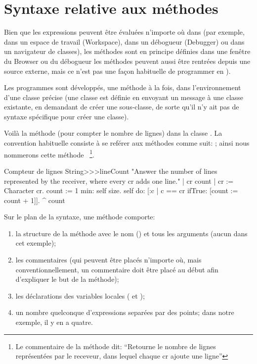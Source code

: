 \documentclass[a4paper,10pt,twoside]{book}
\begin{document}
\section{Syntaxe relative aux méthodes}
Bien que les expressions peuvent être évaluées n'importe
où dans \pharo (par exemple, dans un espace de travail (Workspace),
dans un débogueur (Debugger) ou dans un navigateur de classes), 
les méthodes sont en principe définies dans une fenêtre du
Browser ou du débogueur
les méthodes peuvent aussi être rentrées %
depuis une source externe, mais ce n'est pas une façon habituelle de programmer en \pharo).

Les programmes sont développés, une méthode à la fois,
dans l'environnement d'une classe précise (une classe est définie en envoyant 
un message à une classe existante, en demandant de créer une sous-classe, de sorte 
qu'il n'y ait pas de syntaxe spécifique pour créer une classe).

Voilà la méthode  (pour compter le
nombre de lignes) dans la classe  .
La convention habituelle consiste à se reférer aux méthodes
comme suit: ; ainsi nous nommerons cette
méthode ~\footnote{Le commentaire de la
  méthode dit: 
``Retourne le nombre de lignes représentées par le receveur, dans
    lequel chaque cr ajoute une ligne''}.

\begin{method}[lineCount]{Compteur de lignes}
String>>>lineCount
   "Answer the number of lines represented by the receiver,
   where every cr adds one line."
   | cr count |
   cr := Character cr.
   count := 1  min: self size.
   self do:
      [:c | c == cr ifTrue: [count := count + 1]].
   ^ count
\end{method}

Sur le plan de la syntaxe, une méthode comporte:
\begin{enumerate}
  \item la structure de la méthode avec le nom (\ie {}) et tous les arguments (aucun dans cet exemple);
  \item les commentaires (qui peuvent être placés n'importe
    où, mais conventionnellement, un commentaire doit être placé au début afin d'expliquer le but de la méthode);
  \item les déclarations des variables locales (\ie {} et
    ); 
  \item un nombre quelconque d'expressions separées par des points; dans notre exemple, il y en a quatre.
\end{enumerate}
\end{document}
